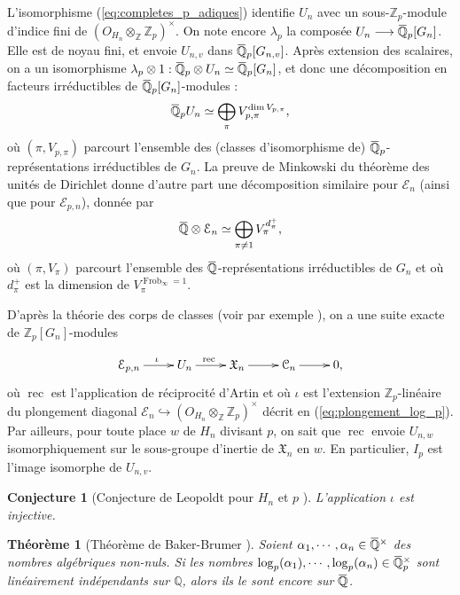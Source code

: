 \documentclass[12pt]{amsart}
\newcommand\bZ{\mathbb{Z}}
\newcommand\bQ{\mathbb{Q}}
\newcommand\Zp{{\mathbb{Z}_{p}}}
\newcommand\cC{\mathcal{C}}
\newcommand\cE{\mathcal{E}}
\newcommand\gX{\mathfrak{X}}
\newcommand{\ob}[1]{\mkern 1.5mu\overline{\mkern-1.5mu#1\mkern-1.5mu}\mkern 1.5mu}
\DeclareMathOperator{\rec}{rec}
\DeclareMathOperator{\Frob}{Frob}
\theoremstyle{defstyle}
\theoremstyle{thmstyle}
\newtheorem{theorem}[subsubsection]{Théorème}
\newtheorem{conjecture}[subsubsection]{Conjecture}
\begin{document}
L'isomorphisme (\ref{eq:completes_p_adiques}) identifie $U_n$ avec un sous-$\Zp$-module d'indice fini de $\left(O_{H_n} \otimes_\bZ \Zp\right)^{\times}$. On note encore $\lambda_p$ la composée $U_n \longrightarrow \ob{\bQ}_p[G_n]$. Elle est de noyau fini, et envoie $U_{n,v}$ dans $\ob{\bQ}_p[G_{n,v}]$. Après extension des scalaires, on a un isomorphisme $\lambda_p \otimes 1 : \ob{\bQ}_p \otimes U_n \simeq \ob{\bQ}_p[G_n]$, et donc une décomposition en facteurs irréductibles de $\ob{\bQ}_p[G_n]$-modules :
$$\ob{\bQ}_pU_n \simeq \bigoplus_\pi V_{p,\pi}^{\dim V_{p,\pi}},$$
où $(\pi,V_{p,\pi})$ parcourt l'ensemble des (classes d'isomorphisme de) $\ob{\bQ}_p$-représentations irréductibles de $G_n$. La preuve de Minkowski du théorème des unités de Dirichlet donne d'autre part une décomposition similaire pour $\cE_{n}$ (ainsi que pour $\cE_{p,n}$), donnée par 
$$ \ob{\bQ} \otimes \cE_{n} \simeq \bigoplus_{\pi\neq 1} V_\pi^{d^+_\pi},$$
où $(\pi,V_{\pi})$ parcourt l'ensemble des $\ob{\bQ}$-représentations irréductibles de $G_n$ et où $d^+_\pi$ est la dimension de $V^{\Frob_\infty=1}_\pi$.

D'après la théorie des corps de classes (voir par exemple \cite[Chap X, Lemma 3.13]{neukirchcohomology}), on a une suite exacte de $\Zp[G_n]$-modules 

\begin{gather}
\begin{aligned}
\xymatrix{
	\cE_{p,n} \ar[r]^\iota & U_n \ar[r]^{\rec\ } & \gX_n \ar[r] & {\cC_n} \ar[r] & 0,
}
\end{aligned}
\label{ex1}
\end{gather} où $\rec$ est l'application de réciprocité d'Artin et où $\iota$ est l'extension $\Zp$-linéaire du plongement diagonal $\cE_{n} \hookrightarrow \left(O_{H_n} \otimes_\bZ \Zp\right)^{\times}$ décrit en (\ref{eq:plongement_log_p}). Par ailleurs, pour toute place $w$ de $H_n$ divisant $p$, on sait que $\rec$ envoie $U_{n,w}$ isomorphiquement sur le sous-groupe d'inertie de $\gX_n$ en $w$. En particulier, ${I_p}$ est l'image isomorphe de $U_{n,v}$. 

\begin{conjecture}[Conjecture de Leopoldt pour $H_n$ et $p$ \cite{leopoldt}]\label{conj:leopoldt}
	L'application $\iota$ est injective. 
\end{conjecture}

\begin{theorem}[Théorème de Baker-Brumer \cite{brumer}]\label{th:BB}
	Soient $\alpha_1, \cdots,\alpha_n \in \ob{\bQ}^\times$ des nombres algébriques non-nuls. Si les nombres $\log_p(\alpha_1), \cdots,\log_p(\alpha_n) \in \ob{\bQ}^\times_p$ sont linéairement indépendants sur $\bQ$, alors ils le sont encore sur $\ob{\bQ}$. 
\end{theorem}
\end{document}
